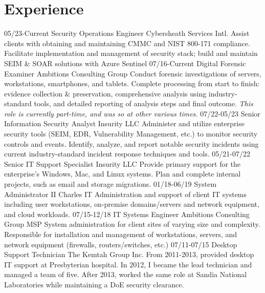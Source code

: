 \documentclass[]{twentysecondcv}
\begin{document}
\section{Experience}
\begin{twenty}
  \twentyitem
    {05/23-Current}
    {Security Operations Engineer}
    {Cybersheath Services Intl.}
    {Assist clients with obtaining and maintaining CMMC and NIST 800-171 compliance.
    Facilitate implementation and management of security stack; build and maintain
    SEIM \& SOAR solutions with Azure Sentinel}
    \twentyitem
    {07/16-Current}
    {Digital Forensic Examiner}
    {Ambitions Consulting Group}
    {Conduct forensic investigations of servers, workstations, smartphones, and
    tablets. Complete processing from start to finish: evidence collection \& preservation,
    comprehensive analysis using industry-standard tools, and detailed reporting of
    analysis steps and final outcome. \emph{This role is currently part-time, and was so at
    other various times.}}
  \twentyitem
    {07/22-05/23}
    {Senior Information Security Analyst}
    {Insurity LLC}
    {Administer and utilize enterprise security tools (SEIM, EDR, Vulnerability
    Management, etc.) to monitor security controls and events. Identify, analyze,
    and report notable security incidents using current industry-standard incident
    response techniques and tools.}
    \twentyitem
    {05/21-07/22}
    {Senior IT Support Specialist}
    {Insurity LLC}
    {Provide primary support for the enterprise's Windows, Mac, and Linux systems.
    Plan and complete internal projects, such as email and storage migrations.}
    \twentyitem
    {01/18-06/19}
    {System Administrator II}
    {Charles IT}
    {Administration and support of client IT systems including  user workstations,
    on-premise domains\slash servers and network equipment, and cloud workloads.}
    \twentyitem
    {07/15-12/18}
    {IT Systems Engineer}
    {Ambitions Consulting Group}
    {MSP System administration for client sites of varying size and complexity. Responsible
    for installation and management of workstations, servers, and network equipment
    (firewalls, routers/switches, etc.)}
    \twentyitem
    {07/11-07/15}
    {Desktop Support Technician}
    {The Kemtah Group Inc.}
    {From 2011-2013, provided desktop IT support at Presbyterian hospital. In 2012,
    I became the lead technician and managed a team of five. After 2013, worked the
    same role at Sandia National Laboratories while maintaining a DoE security clearance.}

\end{twenty}
\end{document}
